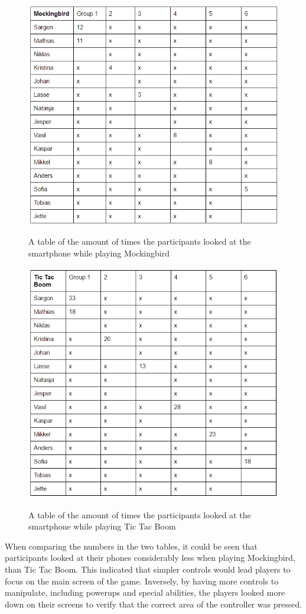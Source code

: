 \begin{figure}
\centering
\includegraphics[width=\textwidth]{figures/birdTable} \label{fig:birdTable}
\caption{A table of the amount of times the participants looked at the smartphone while playing Mockingbird}
\end{figure}

\begin{figure}
\centering
\includegraphics[width=\textwidth]{figures/TTBtable} \label{fig:TTBtable}
\caption{A table of the amount of times the participants looked at the smartphone while playing Tic Tac Boom}
\end{figure}

When comparing the numbers in the two tables, it could be seen that participants looked at their phones considerably less when playing Mockingbird, than Tic Tac Boom. This indicated that simpler controls would lead players to focus on the main screen of the game. Inversely, by having more controls to manipulate, including powerups and special abilities, the players looked more down on their screens to verify that the correct area of the controller was pressed. 
